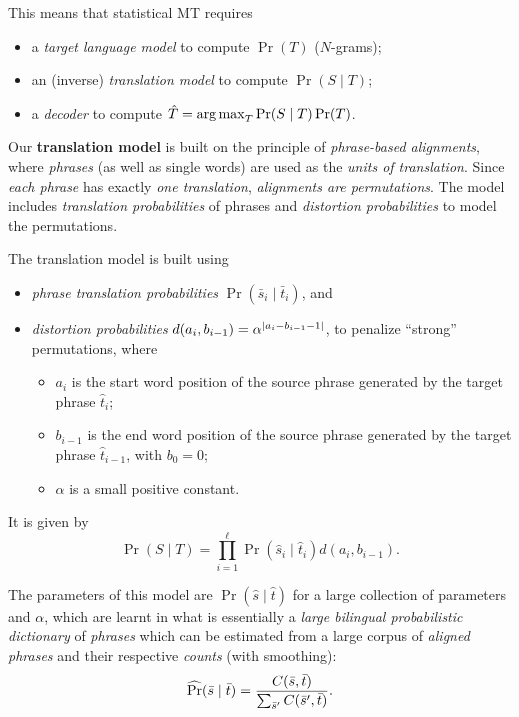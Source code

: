 This means that statistical MT requires
\begin{itemize}
	\item a \emph{target language model} to compute \(\Pr(T)\) (\(N\)-grams);
	\item an (inverse) \emph{translation model} to compute \(\Pr(S \mid T)\);
	\item a \emph{decoder} to compute \(\hat{T} = \operatorname*{arg\,max}_T \Pr(S \mid T) \Pr(T)\).
\end{itemize}

Our \textbf{translation model} is built on the principle of \emph{phrase-based alignments}, where \emph{phrases} (as well as single words) are used as the \emph{units of translation}.
Since \emph{each phrase} has exactly \emph{one translation}, \emph{alignments are permutations}.
The model includes \emph{translation probabilities} of phrases and \emph{distortion probabilities} to model the permutations.

The translation model is built using 
\begin{itemize}
	\item \emph{phrase translation probabilities} \(\Pr(\bar{s}_i \mid \bar{t}_i)\), and
	\item \emph{distortion probabilities} \(d(a_i, b_{i-1}) = \alpha^{{\left\lvert a_i - b_{i-1} - 1\right\lvert}}\), to penalize ``strong'' permutations, where
	\begin{itemize}
		\item \(a_i\) is the start word position of the source phrase generated by the target phrase \(\hat{t}_i\);
		\item \(b_{i-1}\) is the end word position of the source phrase generated by the target phrase \(\hat{t}_{i-1}\), with \(b_0 = 0\);
		\item \(\alpha\) is a small positive constant.
	\end{itemize}
\end{itemize}
It is given by
\[
\Pr(S \mid T) = \prod_{i = 1}^{\ell} \Pr(\hat{s}_i \mid \hat{t}_i) d(a_i, b_{i-1}).
\]

The parameters of this model are \(\Pr(\hat{s} \mid \hat{t})\) for a large collection of parameters and \(\alpha\), which are learnt in what is essentially a \emph{large bilingual probabilistic dictionary} of \emph{phrases} which can be estimated from a large corpus of \emph{aligned phrases} and their respective \emph{counts} (with smoothing):
\[
\operatorname{\widehat{\Pr}}(\bar{s} \mid \bar{t}) = \frac{C(\bar{s}, \bar{t})}{\sum_{\bar{s}'} C(\bar{s}', \bar{t})}.
\]

